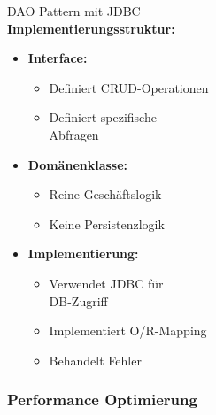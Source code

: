 \begin{concept}{DAO Pattern mit JDBC}\\
    \textbf{Implementierungsstruktur:}

    \begin{minipage}[t]{0.5\textwidth}
\begin{itemize}
    \item \textbf{Interface:}
    \begin{itemize}
        \item Definiert CRUD-Operationen
        \item Definiert spezifische \\ Abfragen
    \end{itemize}
    \item \textbf{Domänenklasse:}
    \begin{itemize}
        \item Reine Geschäftslogik
        \item Keine Persistenzlogik
    \end{itemize}
\end{itemize}
\end{minipage}
\begin{minipage}[t]{0.5\textwidth}
    \begin{itemize}
    \item \textbf{Implementierung:}
    \begin{itemize}
        \item Verwendet JDBC für\\ DB-Zugriff
        \item Implementiert O/R-Mapping
        \item Behandelt Fehler
    \end{itemize}
\end{itemize}
\end{minipage}
\end{concept}



\subsubsection{Performance Optimierung}

